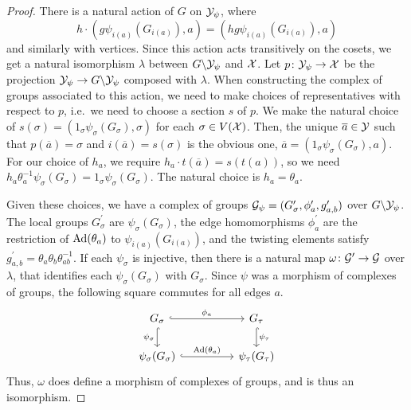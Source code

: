 \begin{proof}
	There is a natural action of $G$ on  $\mathcal{Y}_\psi$, where
	\[
		h \cdot (g\psi_{i(a)}(G_{i(a)}), a) = (hg\psi_{i(a)}(G_{i(a)}), a)
	\]
	and similarly with vertices.
	Since this action acts transitively on the cosets, we get a natural isomorphism $\lambda$ between $G \backslash \mathcal{Y}_\psi$ and  $\mathcal{X}$.
	Let $p \colon \mathcal{Y}_\psi \to \mathcal{X}$ be the projection $\mathcal{Y}_\psi \to G \backslash \mathcal{Y}_\psi$ composed with $\lambda$.
	When constructing the complex of groups associated to this action, we need to make choices of representatives with respect to $p$, i.e.~we need to choose a section $s$ of $p$.
	We make the natural choice of $s(\sigma) = (1_\sigma \psi_\sigma(G_\sigma), \sigma)$ for each $\sigma \in V(\mathcal{X})$.
	Then, the unique $\overline{a} \in \mathcal{Y}$ such that $p(\overline{a}) = \sigma$ and $i(\overline{a}) = s(\sigma)$ is the obvious one, $\overline{a} = (1_\sigma\psi_\sigma(G_\sigma), a)$.
	For our choice of $h_a$, we require  $h_a \cdot t(\overline{a}) = s(t(a))$, so we need $h_a\theta_a^{-1}\psi_\sigma(G_\sigma) = 1_\sigma \psi_\sigma(G_\sigma)$.
	The natural choice is $h_a = \theta_a$.

	Given these choices, we have a complex of groups $\mathcal{G}_\psi = (G^\prime_\sigma, \phi^\prime_a, g^\prime_{a,b})$ over $G \backslash \mathcal{Y}_\psi$.
	The local groups $G^\prime_\sigma$ are $\psi_\sigma(G_\sigma)$, the edge homomorphisms  $\phi^\prime_a$ are the restriction of $\operatorname{Ad}(\theta_a)$ to $\psi_{i(a)}(G_{i(a)})$, and the twisting elements satisfy $g^\prime_{a,b} = \theta_a\theta_b\theta_{ab}^{-1}$.
	If each $\psi_\sigma$ is injective, then there is a natural map $\omega \colon \mathcal{G}^\prime \to \mathcal{G}$ over $\lambda$, that identifies each $\psi_\sigma(G_\sigma)$ with $G_\sigma$.
	Since  $\psi$ was a morphism of complexes of groups, the following square commutes for all edges $a$.
	\[
		\begin{tikzcd}
			G_\sigma \ar[d, hook, "\psi_\sigma"'] \ar[rr, hook, "\phi_a"] && G_\tau \ar[d, hook, "\psi_\tau"] \\
			\psi_\sigma(G_\sigma) \ar[rr, hook, "\ad(\theta_a)"] && \psi_\tau(G_\tau)
		\end{tikzcd}
	\]
	Thus, $\omega$ does define a morphism of complexes of groups, and is thus an isomorphism.
\end{proof}

